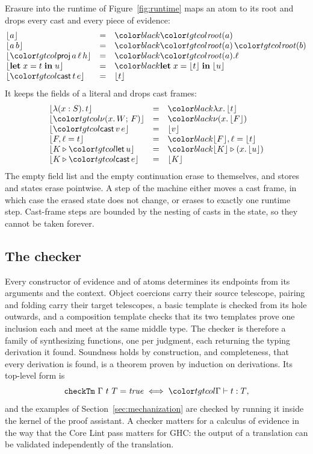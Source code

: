 Erasure into the runtime of Figure~\ref{fig:runtime} maps an atom to its root and drops every cast and every piece of evidence:
\[
\begin{array}{@{}lcl@{}}
\erase{a} & = & \run{\rt{a}} \\
\erase{a\,b} & = & \run{\rt{a}\,\rt{b}} \\
\erase{\ev{proj}\,a\,\ell\,h} & = & \run{\rt{a}.\ell} \\
\erase{\klet x = t \kin u} & = & \run{\klet x = \erase{t} \kin \erase{u}} \\
\erase{\ev{cast}\,t\,e} & = & \erase{t}
\end{array}
\]
It keeps the fields of a literal and drops cast frames:
\[
\begin{array}{@{}lcl@{}}
\erase{\lambda(x : S).\,t} & = & \run{\lambda x.\,\erase{t}} \\
\erase{\lit[x]{W}{F}} & = & \run{\nu(x.\,\erase{F})} \\
\erase{\ev{cast}\,v\,e} & = & \erase{v} \\
\erase{F, \ell = t} & = & \run{\erase{F}, \ell = \erase{t}} \\
\erase{K \triangleright \ev{let}\,u} & = & \run{\erase{K} \triangleright (x.\,\erase{u})} \\
\erase{K \triangleright \ev{cast}\,e} & = & \erase{K}
\end{array}
\]
The empty field list and the empty continuation erase to themselves, and stores and states erase pointwise. A step of the machine either moves a cast frame, in which case the erased state does not change, or erases to exactly one runtime step. Cast-frame steps are bounded by the nesting of casts in the state, so they cannot be taken forever.

\subsection{The checker}

Every constructor of evidence and of atoms determines its endpoints from its arguments and the context. Object coercions carry their source telescope, pairing and folding carry their target telescopes, a basic template is checked from its hole outwards, and a composition template checks that its two templates prove one inclusion each and meet at the same middle type. The checker is therefore a family of synthesizing functions, one per judgment, each returning the typing derivation it found. Soundness holds by construction, and completeness, that every derivation is found, is a theorem proven by induction on derivations. Its top-level form is
\[
\lean{checkTm}\ \Gamma\ t\ T = \mathit{true} \iff \tmj{\Gamma}{t}{T} ,
\]
and the examples of Section~\ref{sec:mechanization} are checked by running it inside the kernel of the proof assistant. A checker matters for a calculus of evidence in the way that the Core Lint pass matters for GHC: the output of a translation can be validated independently of the translation.
